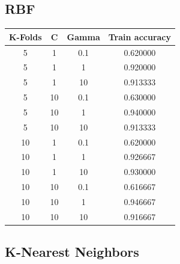 \documentclass{article}
\begin{document}
\subsection{RBF}

\begin{table}[htb]
\begin{tabular}{|c|c|c|c|}
\hline
\textbf{K-Folds} & \textbf{C} & \textbf{Gamma} & \textbf{Train accuracy} \\ \hline
5                & 1          & 0.1            & 0.620000       \\ \hline
5                & 1          & 1              & 0.920000       \\ \hline
5                & 1          & 10             & 0.913333       \\ \hline
5                & 10         & 0.1            & 0.630000       \\ \hline
5                & 10         & 1              & 0.940000       \\ \hline
5                & 10         & 10             & 0.913333       \\ \hline
10               & 1          & 0.1            & 0.620000       \\ \hline
10               & 1          & 1              & 0.926667       \\ \hline
10               & 1          & 10             & 0.930000       \\ \hline
10               & 10         & 0.1            & 0.616667       \\ \hline
\rowcolor[HTML]{34FF34}
10               & 10         & 1              & 0.946667       \\ \hline
10               & 10         & 10             & 0.916667       \\ \hline
\end{tabular}
\end{table}

\subsection{K-Nearest Neighbors}
\end{document}
